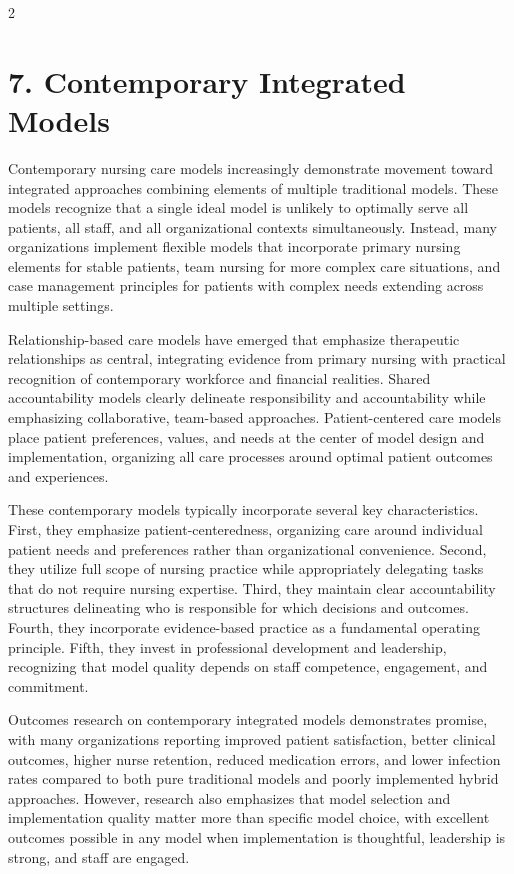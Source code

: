 \documentclass[12pt]{article}
\begin{document}
\begin{multicols}{2}
\section*{7. \quad Contemporary Integrated Models}

Contemporary nursing care models increasingly demonstrate movement toward integrated approaches combining elements of multiple traditional models. These models recognize that a single ideal model is unlikely to optimally serve all patients, all staff, and all organizational contexts simultaneously. Instead, many organizations implement flexible models that incorporate primary nursing elements for stable patients, team nursing for more complex care situations, and case management principles for patients with complex needs extending across multiple settings.

Relationship-based care models have emerged that emphasize therapeutic relationships as central, integrating evidence from primary nursing with practical recognition of contemporary workforce and financial realities. Shared accountability models clearly delineate responsibility and accountability while emphasizing collaborative, team-based approaches. Patient-centered care models place patient preferences, values, and needs at the center of model design and implementation, organizing all care processes around optimal patient outcomes and experiences.

These contemporary models typically incorporate several key characteristics. First, they emphasize patient-centeredness, organizing care around individual patient needs and preferences rather than organizational convenience. Second, they utilize full scope of nursing practice while appropriately delegating tasks that do not require nursing expertise. Third, they maintain clear accountability structures delineating who is responsible for which decisions and outcomes. Fourth, they incorporate evidence-based practice as a fundamental operating principle. Fifth, they invest in professional development and leadership, recognizing that model quality depends on staff competence, engagement, and commitment.

Outcomes research on contemporary integrated models demonstrates promise, with many organizations reporting improved patient satisfaction, better clinical outcomes, higher nurse retention, reduced medication errors, and lower infection rates compared to both pure traditional models and poorly implemented hybrid approaches. However, research also emphasizes that model selection and implementation quality matter more than specific model choice, with excellent outcomes possible in any model when implementation is thoughtful, leadership is strong, and staff are engaged.


\end{multicols}
\end{document}
